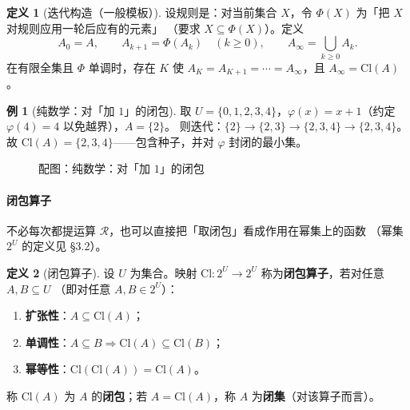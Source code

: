 \documentclass[UTF8,a4paper,11pt]{ctexart}
\theoremstyle{definition}
\newtheorem{definition}{定义}[section]
\newtheorem{example}{例}[section]
\theoremstyle{plain}
\theoremstyle{remark}
\numberwithin{figure}{section}
\numberwithin{table}{section}
\begin{document}
\begin{definition}[迭代构造（一般模板）]
设规则是：对当前集合 $X$，令 $\Phi(X)$ 为「把 $X$ 对规则应用一轮后应有的元素」
（要求 $X\subseteq\Phi(X)$）。定义
\[
A_0=A,\qquad A_{k+1}=\Phi(A_k)\quad(k\ge 0),\qquad
A_\infty=\bigcup_{k\ge 0}A_k.
\]
在有限全集且 $\Phi$ 单调时，存在 $K$ 使 $A_K=A_{K+1}=\cdots=A_\infty$，且 $A_\infty=\mathrm{Cl}(A)$。
\end{definition}

\begin{example}[纯数学：对「加 $1$」的闭包]
取 $U=\{0,1,2,3,4\}$，$\varphi(x)=x+1$（约定 $\varphi(4)=4$ 以免越界），$A=\{2\}$。
则迭代：$\{2\}\to\{2,3\}\to\{2,3,4\}\to\{2,3,4\}$。
故 $\mathrm{Cl}(A)=\{2,3,4\}$——包含种子，并对 $\varphi$ 封闭的最小集。
\begin{figure}[H]
\centering
{}
\caption{配图：纯数学：对「加 $1$」的闭包}
\label{fig:auto-07}
\end{figure}
\end{example}

\paragraph{闭包算子}

不必每次都提运算 $\mathcal{R}$，也可以直接把「取闭包」看成作用在幂集上的函数
（幂集 $2^{U}$ 的定义见 §3.2）。

\begin{definition}[闭包算子]
设 $U$ 为集合。映射 $\mathrm{Cl}:2^{U}\to 2^{U}$ 称为\textbf{闭包算子}，若对任意 $A,B\subseteq U$
（即对任意 $A,B\in 2^{U}$）：
\begin{enumerate}
  \item \textbf{扩张性}：$A\subseteq \mathrm{Cl}(A)$；
  \item \textbf{单调性}：$A\subseteq B\Rightarrow \mathrm{Cl}(A)\subseteq\mathrm{Cl}(B)$；
  \item \textbf{幂等性}：$\mathrm{Cl}(\mathrm{Cl}(A))=\mathrm{Cl}(A)$。
\end{enumerate}
称 $\mathrm{Cl}(A)$ 为 $A$ 的\textbf{闭包}；若 $A=\mathrm{Cl}(A)$，称 $A$ 为\textbf{闭集}（对该算子而言）。
\end{definition}
\end{document}
